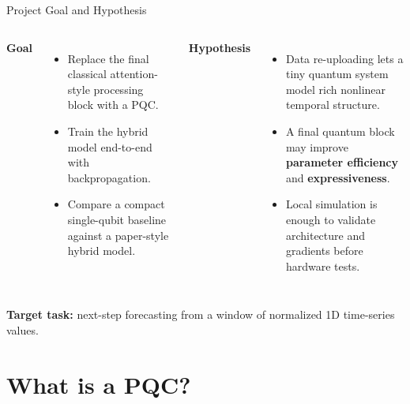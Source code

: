 \documentclass[aspectratio=169,professionalfonts]{beamer}
\begin{document}
\begin{frame}{Project Goal and Hypothesis}
\begin{columns}[T]
\textbf{Goal}
\begin{itemize}
  \item Replace the final classical attention-style processing block with a PQC.
  \item Train the hybrid model end-to-end with backpropagation.
  \item Compare a compact single-qubit baseline against a paper-style hybrid model.
\end{itemize}

\textbf{Hypothesis}
\begin{itemize}
  \item Data re-uploading lets a tiny quantum system model rich nonlinear temporal structure.
  \item A final quantum block may improve \textbf{parameter efficiency} and \textbf{expressiveness}.
  \item Local simulation is enough to validate architecture and gradients before hardware tests.
\end{itemize}
\end{columns}

\vspace{0.6em}
\textbf{Target task:} next-step forecasting from a window of normalized 1D time-series values.
\end{frame}

\section{What is a PQC?}
\end{document}
